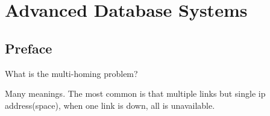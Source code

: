 %
%
%

\chapter{Advanced Database Systems}
\label{intro} %


\section{Preface}
\label{sec:1}

What is the multi-homing problem?

Many meanings. The most common is that multiple links but single ip address(space), when one link is down, all is unavailable.


